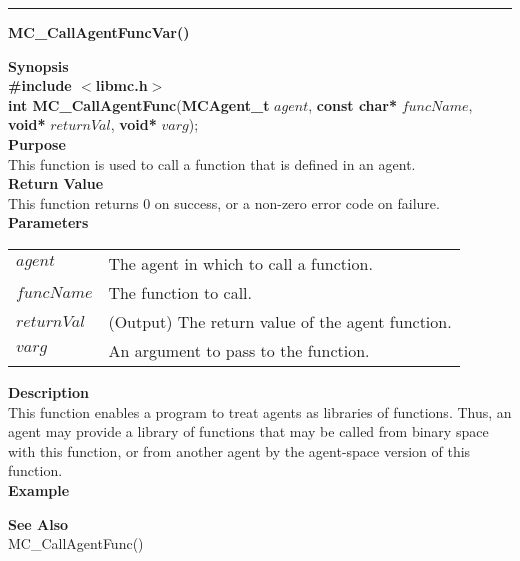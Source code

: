 \noindent
\vspace{5pt}
\rule{6.5in}{0.015in}
\noindent
{}
{\LARGE \bf MC\_CallAgentFuncVar()}\\

\noindent
{\bf Synopsis}\\
{\bf \#include $<$libmc.h$>$}\\
{\bf int MC\_CallAgentFunc}({\bf MCAgent\_t} $agent$, {\bf const char*} $funcName$, {\bf void*} $returnVal$, {\bf void*} $varg$);\\

\noindent
{\bf Purpose}\\
This function is used to call a function that is defined in an agent. \\

\noindent
{\bf Return Value}\\
This function returns 0 on success, or a non-zero error code on failure. \\

\noindent
{\bf Parameters}
\vspace{-0.1in}
\begin{description}
\item
\begin{tabular}{ll}
$agent$ & The agent in which to call a function. \\
$funcName$ & The function to call. \\
$returnVal$ & (Output) The return value of the agent function. \\
$varg$ &  An argument to pass to the function. 
\end{tabular}
\end{description}

\noindent
{\bf Description}\\
This function enables a program to treat agents as libraries of functions. Thus, an agent
may provide a library of functions that may be called from binary space with this function, 
or from another agent by the agent-space version of this function. \\

\noindent
{\bf Example}\\
\noindent
{\footnotesize}

\noindent
{\bf See Also}\\
MC\_CallAgentFunc()


